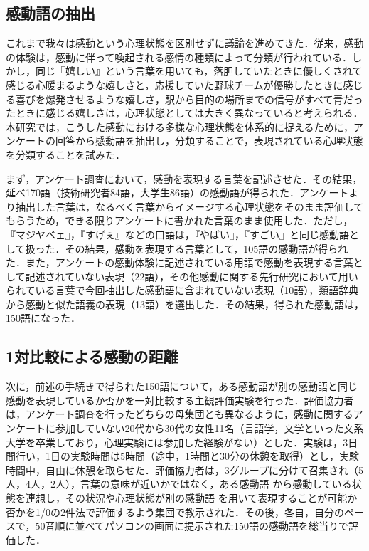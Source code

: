 \documentclass[japanese]{jnlp_1.3c}
\begin{document}
\subsection{感動語の抽出}

これまで我々は感動という心理状態を区別せずに議論を進めてきた．従来，感動の体験は，感動に伴って喚起される感情の種類によって分類が行われている\cite{Article_006}．しかし，同じ『嬉しい』という言葉を用いても，落胆していたときに優しくされて感じる心暖まるような嬉しさと，応援していた野球チームが優勝したときに感じる喜びを爆発させるような嬉しさ，駅から目的の場所までの信号がすべて青だったときに感じる嬉しさは，心理状態としては大きく異なっていると考えられる．本研究では，こうした感動における多様な心理状態を体系的に捉えるために，アンケートの回答から感動語を抽出し，分類することで，表現されている心理状態を分類することを試みた．


まず，アンケート調査において，感動を表現する言葉を記述させた．その結果，延べ170語（技術研究者84語，大学生86語）の感動語が得られた．アンケートより抽出した言葉は，なるべく言葉からイメージする心理状態をそのまま評価してもらうため，できる限りアンケートに書かれた言葉のまま使用した．ただし，『マジヤベェ』，『すげぇ』などの口語は，『やばい』，『すごい』と同じ感動語として扱った．その結果，感動を表現する言葉として，105語の感動語が得られた．また，アンケートの感動体験に記述されている用語で感動を表現する言葉として記述されていない表現（22語），その他感動に関する先行研究において用いられている言葉で今回抽出した感動語に含まれていない表現（10語），類語辞典から感動と似た語義の表現（13語）を選出した．その結果，得られた感動語は，150語になった．



\subsection{1対比較による感動の距離}

次に，前述の手続きで得られた150語について，ある感動語が別の感動語と同じ感動を表現しているか否かを一対比較する主観評価実験を行った．評価協力者は，アンケート調査を行ったどちらの母集団とも異なるように，感動に関するアンケートに参加していない20代から30代の女性11名（言語学，文学といった文系大学を卒業しており，心理実験には参加した経験がない）とした．実験は，3日間行い，1日の実験時間は5時間（途中，1時間と30分の休憩を取得）とし，実験時間中，自由に休憩を取らせた．評価協力者は，3グループに分けて召集され（5人，4人，2人），言葉の意味が近いかではなく，ある感動語 から感動している状態を連想し，その状況や心理状態が別の感動語 を用いて表現することが可能か否かを1/0の2件法で評価するよう集団で教示された．その後，各自，自分のペースで，50音順に並べてパソコンの画面に提示された150語の感動語を総当りで評価した．
\end{document}
